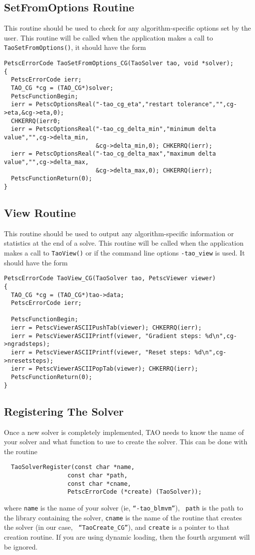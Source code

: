 \subsection{SetFromOptions Routine}
This routine should be used to check for any algorithm-specific options set 
by the user. This routine will be called when the application makes a call
to {\tt TaoSetFromOptions()}, it should have the form
\begin{verbatim}
PetscErrorCode TaoSetFromOptions_CG(TaoSolver tao, void *solver);
{
  PetscErrorCode ierr;
  TAO_CG *cg = (TAO_CG*)solver;
  PetscFunctionBegin;
  ierr = PetscOptionsReal("-tao_cg_eta","restart tolerance","",cg->eta,&cg->eta,0);
  CHKERRQ(ierr0;
  ierr = PetscOptionsReal("-tao_cg_delta_min","minimum delta value","",cg->delta_min,
                          &cg->delta_min,0); CHKERRQ(ierr);
  ierr = PetscOptionsReal("-tao_cg_delta_max","maximum delta value","",cg->delta_max,
                          &cg->delta_max,0); CHKERRQ(ierr);
  PetscFunctionReturn(0);
}
\end{verbatim}

\subsection{View Routine}
This routine should be used to output any algorithm-specific information
or statistics at the end of a solve.
This routine will be called when the application makes a call to 
{\tt TaoView()} or if the command line options {\tt -tao\_view} is used.
It should have the form
\begin{verbatim}
PetscErrorCode TaoView_CG(TaoSolver tao, PetscViewer viewer)
{ 
  TAO_CG *cg = (TAO_CG*)tao->data;
  PetscErrorCode ierr;

  PetscFunctionBegin;
  ierr = PetscViewerASCIIPushTab(viewer); CHKERRQ(ierr);
  ierr = PetscViewerASCIIPrintf(viewer, "Gradient steps: %d\n",cg->ngradsteps);
  ierr = PetscViewerASCIIPrintf(viewer, "Reset steps: %d\n",cg->nresetsteps);
  ierr = PetscViewerASCIIPopTab(viewer); CHKERRQ(ierr);
  PetscFunctionReturn(0);
}
\end{verbatim}


\subsection{Registering The Solver}
Once a new solver is completely implemented, TAO needs to know the name of
your solver and what function to use to create the solver.  This can be done
with the routine
\begin{verbatim}
  TaoSolverRegister(const char *name, 
                  const char *path,
                  const char *cname, 
                  PetscErrorCode (*create) (TaoSolver));
\end{verbatim}
\noindent
where {\tt name} is the name of your solver (ie, {\tt ``-tao\_blmvm''}), {\tt
path} is the path to the library containing the solver, {\tt cname} is the
name of the routine that creates the solver (in our case, {\tt
  ``TaoCreate\_CG''}), and {\tt create} is a pointer to that creation
routine.  If you are using dynamic loading, then the fourth argument will be
ignored.

